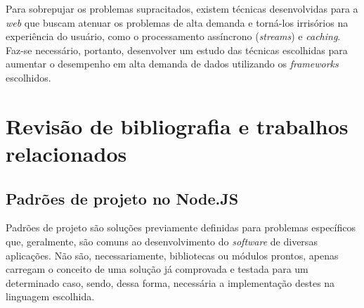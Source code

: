 \documentclass[12pt]{article}
\begin{document}
Para sobrepujar os problemas supracitados, existem técnicas desenvolvidas para a \textit{web} que buscam
atenuar os problemas de alta demanda e torná-los irrisórios na experiência do usuário, como o processamento
assíncrono (\textit{streams}) e \textit{caching}. Faz-se necessário, portanto, desenvolver um estudo das 
técnicas escolhidas para aumentar o desempenho em alta demanda de dados utilizando os \textit{frameworks} 
escolhidos.






\section{Revisão de bibliografia e trabalhos relacionados}

\subsection{Padrões de projeto no Node.JS}

Padrões de projeto são soluções previamente definidas para problemas específicos que, geralmente,
são comuns ao desenvolvimento do \textit{software} de diversas aplicações. Não são, necessariamente, 
bibliotecas ou módulos prontos, apenas carregam o conceito de uma solução já comprovada e testada para um 
determinado caso, sendo, dessa forma, necessária a implementação destes na 
linguagem escolhida. \cite[p. 13]{DIOGORESENDE}
\end{document}

